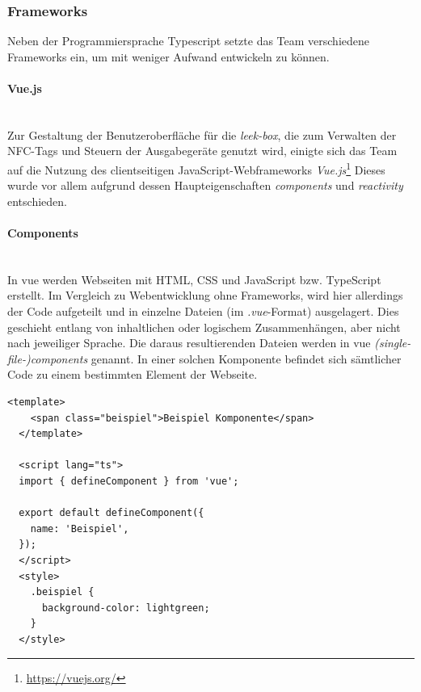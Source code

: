 \documentclass[10pt, a4paper]{article}
\begin{document}
\subsubsection{Frameworks}
Neben der Programmiersprache Typescript setzte das Team verschiedene Frameworks ein, um mit weniger Aufwand entwickeln zu können.

\paragraph*{Vue.js} $~$ \\
Zur Gestaltung der Benutzeroberfläche für die \textit{leek-box}, die zum Verwalten der NFC-Tags und Steuern der Ausgabegeräte genutzt wird, einigte sich das Team auf die Nutzung des
clientseitigen JavaScript-Webframeworks \textit{Vue.js}\footnote{\raggedright\url{https://vuejs.org/}}
Dieses wurde vor allem aufgrund dessen Haupteigenschaften \textit{components} und \textit{reactivity} entschieden.

\paragraph*{Components} $~$ \\
In vue werden Webseiten mit HTML, CSS und JavaScript bzw. TypeScript erstellt.
Im Vergleich zu Webentwicklung ohne Frameworks, wird hier allerdings der Code aufgeteilt
 und in einzelne Dateien (im \textit{.vue}-Format) ausgelagert.
Dies geschieht entlang von inhaltlichen oder logischem Zusammenhängen, aber nicht nach jeweiliger Sprache.
Die daraus resultierenden Dateien werden in vue \textit{(single-file-)components} genannt.
In einer solchen Komponente befindet sich sämtlicher Code zu einem bestimmten Element der Webseite.
\begin{lstlisting}[caption={Beispiel einer simplen \textit{vue component}-Datei}, captionpos=b]
  <template>
    <span class="beispiel">Beispiel Komponente</span>
  </template>

  <script lang="ts">
  import { defineComponent } from 'vue';

  export default defineComponent({
    name: 'Beispiel',
  });
  </script>
  <style>
    .beispiel {
      background-color: lightgreen;
    }
  </style>
\end{lstlisting}
\end{document}
